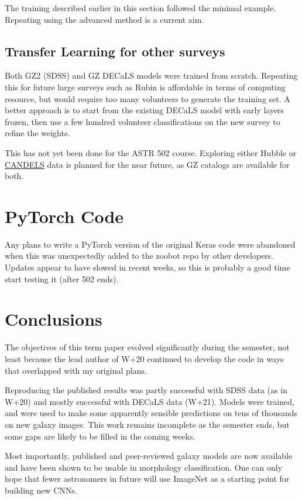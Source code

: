 \documentclass[preprint]{aastex631}
\begin{document}
The training described earlier in this section followed the minimal example. Repeating using the advanced method is a current aim.

\subsection{Transfer Learning for other surveys}

Both GZ2 (SDSS) and GZ DECaLS models were trained from scratch. Repeating this for future large surveys such as Rubin is affordable in terms of computing resource, but would require too many volunteers to generate the training set. A better approach is to start from the existing DECaLS model with early layers frozen, then use a few hundred volunteer classifications on the new survey to refine the weights.

This has not yet been done for the ASTR 502 course. Exploring either Hubble or \href{http://candels.ucolick.org/}{CANDELS} data is planned for the near future, as GZ catalogs are available for both.


\section{PyTorch Code}

Any plans to write a PyTorch version of the original Keras code were abandoned when this was unexpectedly added to the zoobot repo by other developers. Updates appear to have slowed in recent weeks, so this is probably a good time start testing it (after 502 ends).  

\section{Conclusions}

The objectives of this term paper evolved significantly during the semester, not least because the lead author of W+20 continued to develop the code in ways that overlapped with my original plans.

Reproducing the published results was partly successful with SDSS data (as in W+20) and mostly successful with DECaLS data (W+21). Models were trained, and were used to make some apparently sensible predictions on tens of thousands on new galaxy images. This work remains incomplete as the semester ends, but some gaps are likely to be filled in the coming weeks.

Most importantly, published and peer-reviewed galaxy models are now available and have been shown to be usable in morphology classification. One can only hope that fewer astronomers in future will use ImageNet as a starting point for building new CNNs. 


{}

\end{document}
